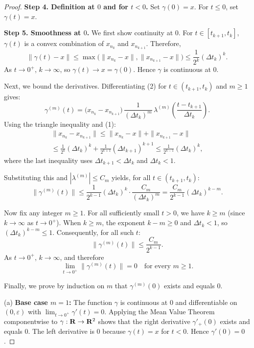 \begin{proof}
  \textbf{Step 4. Definition at $0$ and for $t<0$.}
  Set $\gamma(0)=x$.
  For $t \le 0$, set $\gamma(t)=x$.
  
  \textbf{Step 5. Smoothness at $0$.}
  We first show continuity at $0$.
  For $t \in [t_{k+1}, t_k]$, $\gamma(t)$ is a convex combination of $x_{n_k}$ and $x_{n_{k+1}}$.
  Therefore,
  $$%
    \|\gamma(t) - x\| \le \max\bigl(\|x_{n_k}-x\|, \|x_{n_{k+1}}-x\|\bigr)
    \le \frac{1}{2^k}(\Delta t_k)^k.
    $$%
  As $t \to 0^+$, $k \to \infty$, so $\gamma(t) \to x = \gamma(0)$.
  Hence $\gamma$ is continuous at $0$.
  
  Next,
  we bound the derivatives.
  Differentiating (2) for $t \in (t_{k+1}, t_k)$ and $m \ge 1$ gives:
  $$%
    \gamma^{(m)}(t)=\bigl(x_{n_k}-x_{n_{k+1}}\bigr)\,
    \frac{1}{(\Delta t_k)^m}\,
    \lambda^{(m)}\!\left(\frac{t-t_{k+1}}{\Delta t_k}\right).
    $$%
  Using the triangle inequality and (1):
  \begin{multline*}
    \|x_{n_k}-x_{n_{k+1}}\| \le \|x_{n_k}-x\| + \|x_{n_{k+1}}-x\| \\
    \le \frac{1}{2^k}(\Delta t_k)^k + \frac{1}{2^{k+1}}(\Delta t_{k+1})^{k+1}
    \le \frac{1}{2^{k-1}}(\Delta t_k)^k,
  \end{multline*}
  where the last inequality uses $\Delta t_{k+1} < \Delta t_k$ and $\Delta t_k < 1$.
  
  Substituting this and $|\lambda^{(m)}| \le C_m$ yields,
  for all $t \in (t_{k+1}, t_k)$:
  \begin{equation} \tag{3}
    \|\gamma^{(m)}(t)\| \le \frac{1}{2^{k-1}}(\Delta t_k)^k \cdot \frac{C_m}{(\Delta t_k)^m}
    = \frac{C_m}{2^{k-1}} (\Delta t_k)^{k-m}.
  \end{equation}
  
  Now fix any integer $m \ge 1$.
  For all sufficiently small $t > 0$,
  we have $k \ge m$ (since $k \to \infty$ as $t \to 0^+$).
  When $k \ge m$, the exponent $k-m \ge 0$ and $\Delta t_k < 1$,
  so $(\Delta t_k)^{k-m} \le 1$.
  Consequently,
  for all such $t$:
  $$%
    \|\gamma^{(m)}(t)\| \le \frac{C_m}{2^{k-1}}.
    $$%
  As $t \to 0^+$, $k \to \infty$, and therefore
  $$%
    \lim_{t \to 0^+} \|\gamma^{(m)}(t)\| = 0 \quad \text{for every } m \ge 1.
    $$%
  
  Finally,
  we prove by induction on $m$ that $\gamma^{(m)}(0)$ exists and equals $0$.
  
  (a) \textbf{Base case $m=1$:}
  The function $\gamma$ is continuous at $0$ and differentiable on $(0,\varepsilon)$ with $\lim_{t\to0^+} \gamma'(t) = 0$.
  Applying the Mean Value Theorem componentwise to $\gamma: \mathbf{R} \to \mathbf{R}^2$ shows that the right derivative $\gamma'_+(0)$ exists and equals $0$.
  The left derivative is $0$ because $\gamma(t)=x$ for $t<0$.
  Hence $\gamma'(0)=0$.
  

\end{proof}
